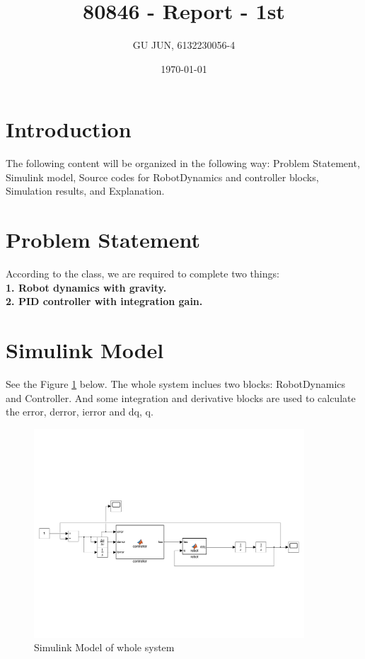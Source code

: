 \documentclass{article}
\title{80846 - Report - 1st}
\author{GU JUN, 6132230056-4}
\date{\today}
\begin{document}
\maketitle

\section*{Introduction}

The following content will be organized in the following way: Problem Statement, Simulink model, Source codes for RobotDynamics and controller blocks, Simulation results, and Explanation.

\section*{Problem Statement}

According to the class, we are required to complete two things: \\
\textbf{1. Robot dynamics with gravity.} \\
\textbf{2. PID controller with integration gain.}

\section{Simulink Model}
See the Figure \ref{fig:model} below. The whole system inclues two blocks: RobotDynamics and Controller.
And some integration and derivative blocks are used to calculate the error, derror, ierror and dq, q.
\begin{figure}[ht]
    \centering
    \includegraphics[width=0.9\textwidth]{figures/model.pdf}
    \caption{Simulink Model of whole system}
    \label{fig:model}
\end{figure}
\end{document}

